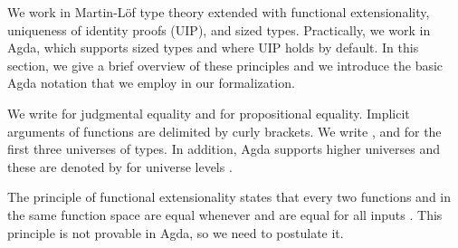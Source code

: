 
We work in Martin-L\"of type theory extended with functional
extensionality, uniqueness of identity proofs (UIP), and sized
types.  Practically, we work in Agda, which supports sized types and
where UIP holds by default. In this section, we give a brief
overview of these principles and we introduce the basic Agda notation
that we employ in our formalization.

We write \Ar{=} for judgmental equality and  for propositional
equality. Implicit arguments of functions are delimited by curly
brackets. We write ,  and  for the first three universes of types.
In addition, Agda supports higher universes and
these are denoted by   for universe levels .

The principle of functional extensionality states that every two
functions  and  in the same function space are
 equal whenever  and  are equal for all
inputs . This principle is not provable in Agda, so we need to
postulate it.
\begin{code}%
\>[0]\<%
\\
\>[0][@{}l@{\AgdaIndent{0}}]%
\>[2]\AgdaSpace{}%
\AgdaSymbol{:}\AgdaSpace{}%
\AgdaSymbol{\{}\AgdaSpace{}%
\AgdaSymbol{:}\AgdaSpace{}%
\AgdaSymbol{\}}\AgdaSpace{}%
\AgdaSymbol{\{}\AgdaSpace{}%
\AgdaSymbol{:}\AgdaSpace{}%
\AgdaSpace{}%
\AgdaSpace{}%
\AgdaSymbol{\}}\AgdaSpace{}%
\AgdaSymbol{\{}\AgdaSpace{}%
\AgdaSpace{}%
\AgdaSymbol{:}\AgdaSpace{}%
\AgdaSymbol{(}\AgdaSpace{}%
\AgdaSymbol{:}\AgdaSpace{}%
\AgdaSymbol{)}\AgdaSpace{}%
\AgdaSpace{}%
\AgdaSpace{}%
\AgdaSymbol{\}}\AgdaSpace{}%
\AgdaSpace{}%
\AgdaSymbol{((}\AgdaSpace{}%
\AgdaSymbol{:}\AgdaSpace{}%
\AgdaSymbol{)}\AgdaSpace{}%
\AgdaSpace{}%
\AgdaSpace{}%
\AgdaSpace{}%
\AgdaSpace{}%
\AgdaSpace{}%
\AgdaSymbol{)}\AgdaSpace{}%
\AgdaSpace{}%
\AgdaSpace{}%
\AgdaSpace{}%
\<%
\end{code}

